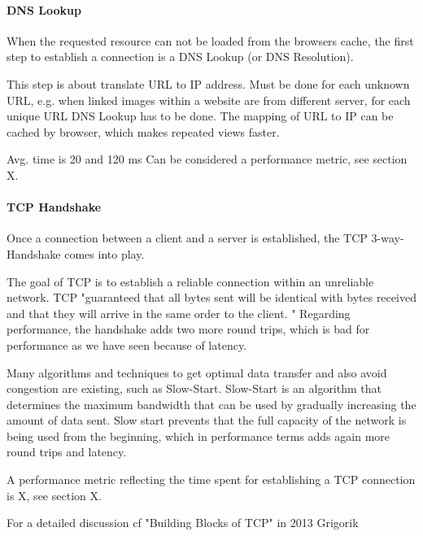 

\paragraph{DNS Lookup}

When the requested resource can not be loaded from the browsers cache, the first step to establish a connection is a DNS Lookup (or DNS Resolution).

This step is about translate URL to IP address.
Must be done for each unknown URL, e.g. when linked images within a website are from different server, for each unique URL DNS Lookup has to be done.
The mapping of URL to IP can be cached by browser, which makes repeated views faster. %

Avg. time is 20 and 120 ms %
Can be considered a performance metric, see section X.




\paragraph{TCP Handshake}

Once a connection between a client and a server is established, the TCP 3-way-Handshake comes into play.

The goal of TCP is to establish a reliable connection within an unreliable network.
TCP  "guaranteed that all bytes sent will be identical with bytes received and that they will arrive in the same order to the client. " %
Regarding performance, the handshake adds two more round trips, which is bad for performance as we have seen because of latency.

Many algorithms and techniques to get optimal data transfer and also avoid congestion are existing, such as Slow-Start.
Slow-Start is an algorithm that determines the maximum bandwidth that can be used by gradually increasing the amount of data sent.
Slow start prevents that the full capacity of the network is being used from the beginning, which in performance terms adds again more round trips and latency. %


A performance metric reflecting the time spent for establishing a TCP connection is X, see section X.

For a detailed discussion cf "Building Blocks of TCP" in 2013 Grigorik %



